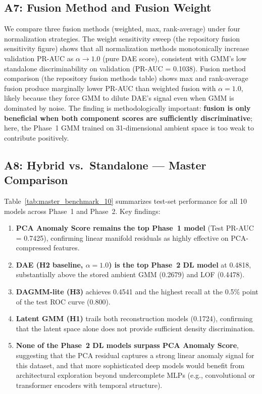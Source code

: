 \subsection{A7: Fusion Method and Fusion Weight}
\label{sec:abl_fusion}

We compare three fusion methods (weighted, max, rank-average) under four normalization strategies. The weight sensitivity sweep (the repository fusion sensitivity figure) shows that all normalization methods monotonically increase validation PR-AUC as $\alpha \to 1.0$ (pure DAE score), consistent with GMM's low standalone discriminability on validation (PR-AUC = 0.1038). Fusion method comparison (the repository fusion methods table) shows max and rank-average fusion produce marginally lower PR-AUC than weighted fusion with $\alpha = 1.0$, likely because they force GMM to dilute DAE's signal even when GMM is dominated by noise. The finding is methodologically important: \textbf{fusion is only beneficial when both component scores are sufficiently discriminative}; here, the Phase~1 GMM trained on 31-dimensional ambient space is too weak to contribute positively.

\subsection{A8: Hybrid vs.\ Standalone --- Master Comparison}
\label{sec:abl_master}

Table~\ref{tab:master_benchmark_10} summarizes test-set performance for all 10 models across Phase~1 and Phase~2. Key findings:

\begin{enumerate}
    \item \textbf{PCA Anomaly Score remains the top Phase~1 model} (Test PR-AUC = 0.7425), confirming linear manifold residuals as highly effective on PCA-compressed features.
    \item \textbf{DAE (H2 baseline, $\alpha=1.0$) is the top Phase~2 DL model} at 0.4818, substantially above the stored ambient GMM (0.2679) and LOF (0.4478).
    \item \textbf{DAGMM-lite (H3)} achieves 0.4541 and the highest recall at the 0.5\% point of the test ROC curve (0.800).
    \item \textbf{Latent GMM (H1)} trails both reconstruction models (0.1724), confirming that the latent space alone does not provide sufficient density discrimination.
    \item \textbf{None of the Phase~2 DL models surpass PCA Anomaly Score}, suggesting that the PCA residual captures a strong linear anomaly signal for this dataset, and that more sophisticated deep models would benefit from architectural exploration beyond undercomplete MLPs (e.g., convolutional or transformer encoders with temporal structure).
\end{enumerate}

